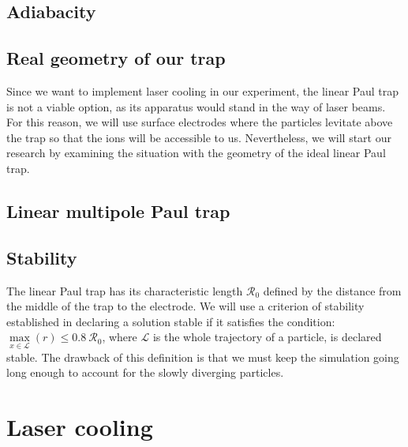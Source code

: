 \subsection{Adiabacity}

\xxx{\dots}

\subsection{Real geometry of our trap}
Since we want to implement laser cooling in our experiment, the linear Paul trap is not a viable option, as its apparatus would stand in the way of laser beams. For this reason, we will use surface electrodes where the particles levitate above the trap so that the ions will be accessible to us. Nevertheless, we will start our research by examining the situation with the geometry of the ideal linear Paul trap.


\subsection{Linear multipole Paul trap}

\subsection{Stability}

The linear Paul trap has its characteristic length $\mathcal{R}_0$ defined by the distance from the middle of the trap to the electrode. We will use a criterion of stability established in \cite{gerlich1992inhomogeneous} declaring a solution stable if it satisfies the condition: \\ $\max\limits_{x \in \mathcal{L}}(r) \leq 0.8 \ \mathcal{R}_0$, where $\mathcal{L}$ is the whole trajectory of a particle, is declared stable. The drawback of this definition is that we must keep the simulation going long enough to account for the slowly diverging particles.

\section{Laser cooling} 


